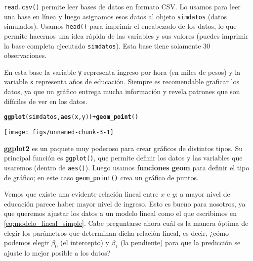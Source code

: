 \documentclass{report}\usepackage[]{graphicx}\usepackage[]{color}
\makeatletter
\newcommand{\hlopt}[1]{\textcolor[rgb]{0,0,0}{#1}}%
\newcommand{\hlstd}[1]{\textcolor[rgb]{0.345,0.345,0.345}{#1}}%
\newcommand{\hlkwd}[1]{\textcolor[rgb]{0.737,0.353,0.396}{\textbf{#1}}}%
\newenvironment{kframe}{%
 \def\at@end@of@kframe{}%
 \ifinner\ifhmode%
  \def\at@end@of@kframe{\end{minipage}}%
  \begin{minipage}{\columnwidth}%
 \fi\fi%
 \def\FrameCommand##1{\hskip\@totalleftmargin \hskip-\fboxsep
 \colorbox{shadecolor}{##1}\hskip-\fboxsep
     \hskip-\linewidth \hskip-\@totalleftmargin \hskip\columnwidth}%
 \MakeFramed {\advance\hsize-\width
   \@totalleftmargin\z@ \linewidth\hsize
   \@setminipage}}%
 {\par\unskip\endMakeFramed%
 \at@end@of@kframe}
\newenvironment{knitrout}{}{} %
\newcommand*{\paq}[1]{\textbf{#1}\index{#1@\textbf{#1}}}
\newcommand*{\kw}[1]{\textbf{#1}\index{#1}}
\makeatother
\begin{document}
\begin{Rbox}
\verb|read.csv()| permite leer bases de datos en formato CSV. Lo usamos para leer una base en línea y luego asignamos esos datos al objeto \verb|simdatos| (datos simulados). 
Usamos \verb|head()| para imprimir el encabezado de los datos, lo que permite hacernos una idea rápida de las variables y sus valores (puedes imprimir la base completa ejecutado \verb|simdatos|).
Esta base tiene solamente 30 observaciones.
\end{Rbox}

En esta base la variable \verb|y| representa ingreso por hora (en miles de pesos) y la variable \verb|x| representa años de educación.
Siempre es recomendable graficar los datos, ya que un gráfico entrega mucha información y revela patrones que son difíciles de ver en los datos.

\begin{knitrout}
\color{fgcolor}\begin{kframe}
\begin{alltt}
\hlkwd{ggplot}\hlstd{(simdatos,} \hlkwd{aes}\hlstd{(x, y))} \hlopt{+} \hlkwd{geom_point}\hlstd{()}
\end{alltt}
\end{kframe}

{\centering \texttt{[image: figs/unnamed-chunk-3-1]} 

}



\end{knitrout}

\begin{Rbox}
\paq{ggplot2} es un paquete muy poderoso para crear gráficos de distintos tipos. Su principal función es \verb|ggplot()|, que permite definir los datos y las variables que usaremos (dentro de \verb|aes()|). Luego usamos \kw{funciones geom} para definir el tipo de gráfico; en este caso \verb|geom_point()| crea un gráfico de puntos.
\end{Rbox}

Vemos que existe una evidente relación lineal entre $x$ e $y$: a mayor nivel de educación parece haber mayor nivel de ingreso.
Esto es bueno para nosotros, ya que queremos ajustar los datos a un modelo lineal como el que escribimos en \eqref{eq:modelo_lineal_simple}.
Cabe preguntarse ahora cuál es la manera óptima de elegir los parámetros que determinan dicha relación lineal, es decir, ¿cómo podemos elegir $\beta_0$ (el intercepto) y $\beta_1$ (la pendiente) para que la predicción se ajuste lo mejor posible a los datos?
\end{document}
